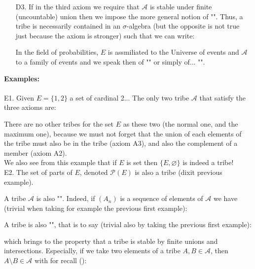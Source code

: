 \begin{enumerate}
	\item[D3.] If in the third axiom we require that $\mathcal{A}$ is stable under finite (uncountable) union then we impose the more general notion of "". Thus, a tribe is necessarily contained in an $\sigma$-algebra (but the opposite is not true just because the axiom is stronger) such that we can write:
	
	\begin{tcolorbox}[title=Remark,colframe=black,arc=10pt]
	In the field of probabilities, $E$ is assmiliated to the Universe of events and $\mathcal{A}$ to a family of events and we speak then of "" or simply of... "".
	\end{tcolorbox}	
	\end{enumerate}
	\begin{tcolorbox}[colframe=black,colback=white,sharp corners]
	\textbf{{\Large {}}Examples:}\\\\
	E1. Given $E=\{1,2\}$ a set of cardinal 2... The only two tribe $\mathcal{A}$ that satisfy the three axioms are:
	
	There are no other tribes for the set $E$ as these two (the normal one, and the maximum one), because we must not forget that the union of each elements of the tribe must also be in the tribe (axiom A3), and also the complement of a member (axiom A2).\\
	
	We also see from this example that if $E$ is set then $\{E,\varnothing\}$ is indeed a tribe!\\
	
	E2. The set of parts of $E$, denoted $\mathcal{P}(E)$ is also a tribe (dixit previous example).
	\end{tcolorbox}
	A tribe $\mathcal{A}$ is also "". Indeed, if $(A_n)$ is a sequence of elements of $\mathcal{A}$ we have (trivial when taking for example the previous first example):
	
	A tribe is also "", that is to say (trivial also by taking the previous first example):
	
	which brings to the property that a tribe is stable by finite unions and intersections. Especially, if we take two elements of a tribe $A,B\in \mathcal{A}$, then $A\setminus B\in \mathcal{A}$ with for recall ():
	
